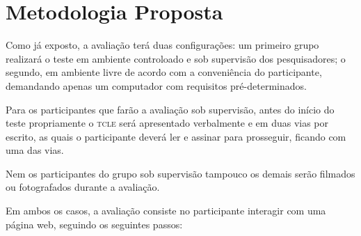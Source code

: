 \documentclass[a4paper,11pt,titlepage,singlespacing]{article}
\newcommand\todo[1]{\textcolor{red}{#1}}
\begin{document}


\section{Metodologia Proposta}

\noindent Como já exposto, a avaliação terá duas configurações: um primeiro grupo realizará o teste em ambiente controloado e sob supervisão dos pesquisadores; o segundo, em ambiente livre de acordo com a conveniência do participante, demandando apenas um computador com requisitos pré-determinados.

Para os participantes que farão a avaliação sob supervisão, antes do início do teste propriamente o \textsc{tcle} será apresentado verbalmente e em duas vias por escrito, as quais o participante deverá ler e assinar para prosseguir, ficando com uma das vias.




Nem os participantes do grupo sob supervisão tampouco os demais serão filmados ou fotografados durante a avaliação.

Em ambos os casos, a avaliação consiste no participante interagir com uma página web, seguindo os seguintes passos:
\end{document}
